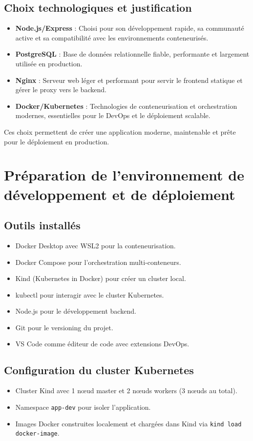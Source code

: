 \documentclass[11pt,a4paper,oneside]{report}
\begin{document}
\section{Choix technologiques et justification}
\begin{itemize}
\item \textbf{Node.js/Express} : Choisi pour son développement rapide, sa communauté active et sa compatibilité avec les environnements conteneurisés.
\item \textbf{PostgreSQL} : Base de données relationnelle fiable, performante et largement utilisée en production.
\item \textbf{Nginx} : Serveur web léger et performant pour servir le frontend statique et gérer le proxy vers le backend.
\item \textbf{Docker/Kubernetes} : Technologies de conteneurisation et orchestration modernes, essentielles pour le DevOps et le déploiement scalable.
\end{itemize}
Ces choix permettent de créer une application moderne, maintenable et prête pour le déploiement en production.

\chapter{Préparation de l'environnement de développement et de déploiement}

\section{Outils installés}
\begin{itemize}
\item Docker Desktop avec WSL2 pour la conteneurisation.
\item Docker Compose pour l'orchestration multi-conteneurs.
\item Kind (Kubernetes in Docker) pour créer un cluster local.
\item kubectl pour interagir avec le cluster Kubernetes.
\item Node.js pour le développement backend.
\item Git pour le versioning du projet.
\item VS Code comme éditeur de code avec extensions DevOps.
\end{itemize}

\section{Configuration du cluster Kubernetes}
\begin{itemize}
\item Cluster Kind avec 1 nœud master et 2 nœuds workers (3 nœuds au total).
\item Namespace \texttt{app-dev} pour isoler l'application.
\item Images Docker construites localement et chargées dans Kind via \texttt{kind load docker-image}.
\end{itemize}
\end{document}
